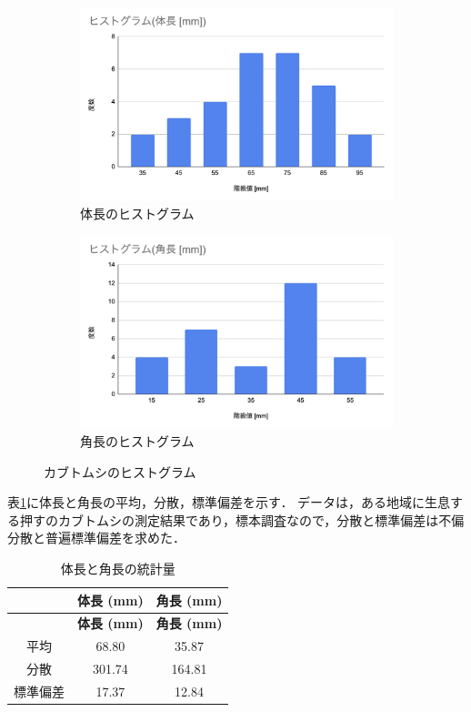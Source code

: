 \documentclass[titlepage,a4paper]{jsarticle}
\begin{document}
\begin{figure}[h]
  \centering
  \begin{subfigure}{0.45\textwidth}
    \centering
    \includegraphics[width=\textwidth]{img/TT_hist.png}
    \caption{体長のヒストグラム}
    \label{fig:image1}
  \end{subfigure}
  \begin{subfigure}{0.45\textwidth}
    \centering
    \includegraphics[width=\textwidth]{img/KT_hist.png}
    \caption{角長のヒストグラム}
    \label{fig:image2}
  \end{subfigure}
  \caption{カブトムシのヒストグラム}
  \label{fig:side_by_side_images}
\end{figure}

表\ref{tab:statistics}に体長と角長の平均，分散，標準偏差を示す．
データは，ある地域に生息する押すのカブトムシの測定結果であり，標本調査なので，分散と標準偏差は不偏分散と普遍標準偏差を求めた．
\begin{longtable}{|c|c|c|}
  \caption{体長と角長の統計量} \label{tab:statistics}      \\ \hline
  \textbf{} & \textbf{体長 (mm)} & \textbf{角長 (mm)} \\ \hline
  \endfirsthead
  \hline
  \textbf{} & \textbf{体長 (mm)} & \textbf{角長 (mm)} \\ \hline
  \endhead
  平均        & 68.80            & 35.87            \\ \hline
  分散        & 301.74           & 164.81           \\ \hline
  標準偏差      & 17.37            & 12.84            \\ \hline
\end{longtable}
\end{document}
